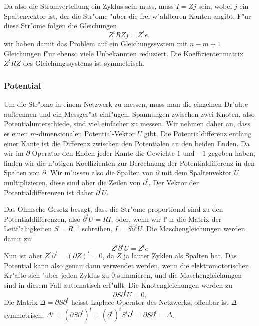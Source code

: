 Da also die Stromverteilung ein Zyklus sein muss, muss $I=Zj$ sein, wobei
$j$ ein Spaltenvektor ist, der die Str"ome "uber die frei w"ahlbaren
Kanten angibt. F"ur diese Str"ome folgen die Gleichungen
\[
Z^tRZj=Z^te,
\]
wir haben damit das Problem auf ein Gleichungssystem mit $n-m+1$
Gleichungen f"ur ebenso viele Unbekannten reduziert.
Die Koeffizientenmatrix $Z^tRZ$ des Gleichungssystems ist symmetrisch.

\subsubsection{Potential}
Um die Str"ome in einem Netzwerk zu messen, muss man die einzelnen
Dr"ahte auftrennen und ein Messger"at einf"ugen.
Spannungen zwischen zwei Knoten, also Potentialunterschiede,
sind viel einfacher zu messen.
Wir nehmen daher an, dass es einen $m$-dimensionalen
Potential-Vektor $U$ gibt.
Die Potentialdifferenz entlang einer Kante ist die Differenz
zwischen den Potentialen an den beiden Enden.
Da wir im $\partial$-Operator den Enden jeder Kante die Gewichte
$1$ und $-1$ gegeben haben, finden wir die n"otigen Koeffizienten
zur Berechnung der Potentialdifferenz in den Spalten von $\partial$.
Wir m"ussen also die Spalten von $\partial$ mit dem Spaltenvektor $U$
multiplizieren, diese sind aber die Zeilen von $\partial^t$.
Der Vektor der Potentialdifferenzen ist daher $\partial^t U$.

Das Ohmsche Gesetz besagt, dass die Str"ome proportional sind zu
den Potentialdifferenzen, also $\partial^t U=RI$, oder, wenn
wir f"ur die Matrix der Leitf"ahigkeiten $S=R^{-1}$ schreiben,
$I=S\partial^t U$. Die Maschengleichungen werden damit zu
\[
Z^t\partial^t U=Z^te
\]
Nun ist aber $Z^t\partial^t=(\partial Z)^t=0$, da $Z$ ja lauter
Zyklen als Spalten hat. Das Potential kann also genau dann verwendet
werden, wenn die elektromotorischen Kr"afte sich "uber jeden Zyklus zu $0$
summieren, und die
Maschengleichungen sind in diesem Fall automatisch erf"ullt.
Die Knotengleichungen werden zu
\[
\partial S\partial^tU=0.
\]
Die Matrix $\Delta = \partial S\partial ^t$ heisst Laplace-Operator des
Netzwerks, offenbar ist $\Delta$ symmetrisch:
$\Delta^t=(\partial S\partial^t)^t
         =(\partial^t)^tS^t\partial^t
         =\partial S\partial^t
         =\Delta$.

